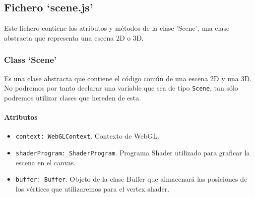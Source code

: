 \subsection{Fichero `scene.js'}

Este fichero contiene los atributos y métodos de la clase 'Scene', una clase abstracta que representa una escena 2D o 3D.

\subsubsection{Class `Scene'}
Es una clase abstracta que contiene el código común de una escena 2D y una 3D. No podremos por tanto declarar una variable que sea de tipo \verb|Scene|, tan sólo podremos utilizar clases que hereden de esta.

\paragraph*{Atributos}
\begin{itemize}
    \item \verb|context: WebGLContext|. Contexto de WebGL.
    \item \verb|shaderProgram: ShaderProgram|. Programa Shader utilizado para graficar la escena en el canvas.
    \item \verb|buffer: Buffer|. Objeto de la clase Buffer que almacenará las posiciones de los vértices que utilizaremos para el vertex shader.
\end{itemize}
